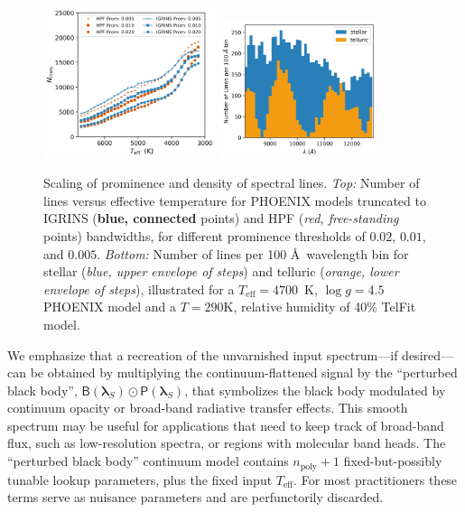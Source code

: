 \documentclass[twocolumn]{aastex631}
\begin{document}
\begin{figure}[hbt!]
    \centering
    \includegraphics[width=0.45\textwidth]{figures/N_lines_vs_Teff_prom.png}
    \includegraphics[width=0.41\textwidth]{figures/line_density_demo.png}
    \caption{Scaling of prominence and density of spectral lines.
        \emph{Top:} Number of lines versus effective temperature for PHOENIX models truncated to IGRINS (\textbf{blue, connected} points) and HPF (\emph{red, free-standing} points) bandwidths, for different prominence thresholds of $0.02$, $0.01$, and $0.005$.
        \emph{Bottom:} Number of lines per 100 \AA\ wavelength bin for stellar (\emph{blue, upper envelope of steps}) and telluric (\emph{orange, lower envelope of steps}), illustrated for a $T_\mathrm{eff}=4700$~K, $\log{g}=4.5$ PHOENIX model and a $T=290 \mathrm{K}$, relative humidity of 40\% TelFit model.}
    \label{fig_Nlines_vs_teff}
\end{figure}



We emphasize that a recreation of the unvarnished input spectrum---if desired---can be obtained by multiplying the continuum-flattened signal by the ``perturbed black body'', $\mathsf{B}(\bm{\lambda}_S)\odot \mathsf{P}(\bm{\lambda}_S)$, that symbolizes the black body modulated by continuum opacity or broad-band radiative transfer effects. This smooth spectrum may be useful for applications that need to keep track of broad-band flux, such as low-resolution spectra, or regions with molecular band heads. The ``perturbed black body'' continuum model contains $n_{\mathrm{poly}}+1$ fixed-but-possibly tunable lookup parameters, plus the fixed input $T_{\mathrm{eff}}$.  For most practitioners these terms serve as nuisance parameters and are perfunctorily discarded.
\end{document}
